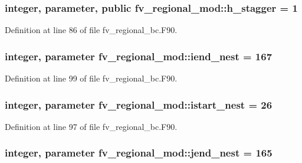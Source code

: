 \subsubsection[{h\-\_\-stagger}]{\setlength{\rightskip}{0pt plus 5cm}integer, parameter, public fv\-\_\-regional\-\_\-mod\-::h\-\_\-stagger = 1}\label{classfv__regional__mod_ab84d267f8311598530c8783263ad1bc8}


Definition at line 86 of file fv\-\_\-regional\-\_\-bc.\-F90.

\subsubsection[{iend\-\_\-nest}]{\setlength{\rightskip}{0pt plus 5cm}integer, parameter fv\-\_\-regional\-\_\-mod\-::iend\-\_\-nest = 167\hspace{0.3cm}{\ttfamily [private]}}\label{classfv__regional__mod_a46c63eb6b1a90522b1981ef852cf36db}


Definition at line 99 of file fv\-\_\-regional\-\_\-bc.\-F90.

\subsubsection[{istart\-\_\-nest}]{\setlength{\rightskip}{0pt plus 5cm}integer, parameter fv\-\_\-regional\-\_\-mod\-::istart\-\_\-nest = 26\hspace{0.3cm}{\ttfamily [private]}}\label{classfv__regional__mod_a12a863dffbbb16718ce4b2e1fbb7acaa}


Definition at line 97 of file fv\-\_\-regional\-\_\-bc.\-F90.

\subsubsection[{jend\-\_\-nest}]{\setlength{\rightskip}{0pt plus 5cm}integer, parameter fv\-\_\-regional\-\_\-mod\-::jend\-\_\-nest = 165\hspace{0.3cm}{\ttfamily [private]}}\label{classfv__regional__mod_a4d47ea369899bf92a118fcc384d143c6}


